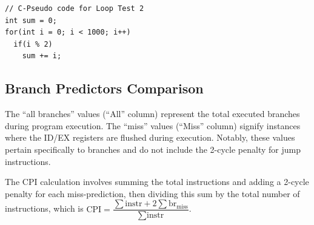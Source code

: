 \documentclass[12pt,a4paper,oneside]{book} %
\begin{document}
\begin{verbatim}
// C-Pseudo code for Loop Test 2
int sum = 0;
for(int i = 0; i < 1000; i++)
  if(i % 2)
    sum += i;
\end{verbatim}

\subsection{Branch Predictors Comparison}
The ``all branches'' values (``All'' column) represent the total executed branches during program execution. The ``miss'' values (``Miss'' column) signify instances where the ID/EX registers are flushed during execution. Notably, these values pertain specifically to branches and do not include the 2-cycle penalty for jump instructions.

The CPI calculation involves summing the total instructions and adding a 2-cycle penalty for each miss-prediction, then dividing this sum by the total number of instructions, which is $\text{CPI} = \dfrac{\sum \text{instr} + 2\sum \text{br}_{\text{miss}}}{\sum \text{instr} }$.
\end{document}
